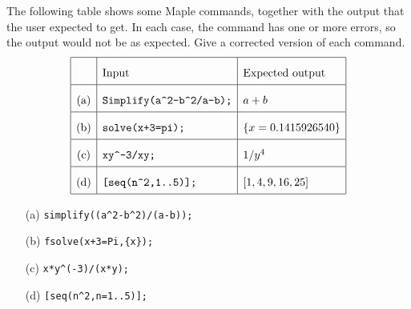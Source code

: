 \documentclass[a4paper]{article}
\begin{document}
\begin{problem}
 The following table shows some Maple commands, together
 with the output that the user expected to get.  In each
 case, the command has one or more errors, so the output
 would not be as expected.  Give a corrected version of each
 command.   
 \[ \renewcommand{\arraystretch}{2}
    \begin{array}{|c|l|l|}
     \hline
      & \mbox{Input} & \mbox{Expected output} \\ \hline
      \mbox{(a)} &
      \verb~Simplify(a^2-b^2/a-b);~ &
      a+b \\ \hline
      \mbox{(b)} &
      \verb~solve(x+3=pi);~ &
      \{x=0.1415926540\} \\ \hline
      \mbox{(c)} &
      \verb~xy^-3/xy;~ &
      1/y^4 \\ \hline
      \mbox{(d)} &
      \verb~[seq(n^2,1..5)];~ &
      [1,4,9,16,25] \\ \hline
    \end{array}
 \]
\end{problem}
\begin{solution}
 \begin{itemize}
  \item[(a)] \verb~simplify((a^2-b^2)/(a-b));~         \hspace{2em}
  \item[(b)] \verb~fsolve(x+3=Pi,{x});~               \hspace{2em}
  \item[(c)] \verb~x*y^(-3)/(x*y);~                 \hspace{2em}
  \item[(d)] \verb~[seq(n^2,n=1..5)];~         \hspace{2em}
 \end{itemize}
\end{solution}
\end{document}

